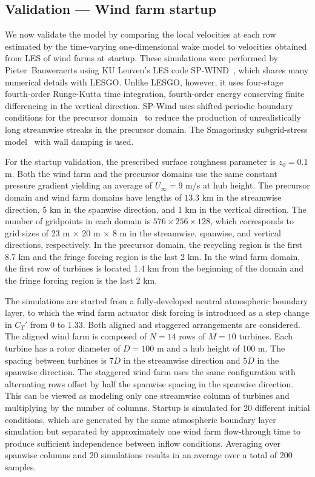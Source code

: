 \subsection{Validation --- Wind farm startup}
\label{subsec:dynwake-1d-validation}
We now validate the model by comparing the local velocities at each row estimated by the time-varying one-dimensional wake model to velocities obtained from LES of wind farms at startup. These simulations were performed by Pieter~Bauweraerts using KU Leuven's LES code SP-WIND~\cite{Goit2015a, Calaf2010a, Munters2016a}, which shares many numerical details with LESGO.  Unlike LESGO, however, it uses four-stage fourth-order Runge-Kutta time integration, fourth-order energy conserving finite differencing in the vertical direction. SP-Wind uses shifted periodic boundary conditions for the precursor domain~\cite{Munters2016a} to reduce the production of unrealistically long streamwise streaks in the precursor domain. The Smagorinsky subgrid-stress model~\cite{Smagorinsky1963a} with wall damping is used.

For the startup validation, the prescribed surface roughness parameter is $z_{0} = 0.1$ m. Both the wind farm and the precursor domains use the same constant pressure gradient yielding an average of $U_\infty = 9$ m/s at hub height. The precursor domain and wind farm domains have lengths of $13.3$ km in the streamwise direction, 5 km in the spanwise direction, and 1 km in the vertical direction. The number of gridpoints in each domain is $576 \times 256 \times 128$, which corresponds to grid sizes of 23 m $\times$ 20 m $\times$ 8 m in the streamwise, spanwise, and vertical directions, respectively. In the precursor domain, the recycling region is the first 8.7 km and the fringe forcing region is the last 2 km. In the wind farm domain, the first row of turbines is located 1.4 km from the beginning of the domain and the fringe forcing region is the last 2 km. 

 The simulations are started from a fully-developed neutral atmospheric boundary layer, to which the wind farm actuator disk forcing is introduced as a step change in $C_T'$ from 0 to 1.33. Both aligned and staggered arrangements are considered. The aligned wind farm is composed of $N=14$ rows of $M=10$ turbines. Each turbine has a rotor diameter of $D=100$ m and a hub height of 100 m. The spacing between turbines is $7D$ in the streamwise direction and $5D$ in the spanwise direction. The staggered wind farm uses the same configuration with alternating rows offset by half the spanwise spacing in the spanwise direction. This can be viewed as modeling only one streamwise column of turbines and multiplying by the number of columns. Startup is simulated for 20 different initial conditions, which are generated by the same atmospheric boundary layer simulation but separated by approximately one wind farm flow-through time to produce sufficient independence between inflow conditions. Averaging over spanwise columns and 20 simulations results in an average over a total of 200 samples.

